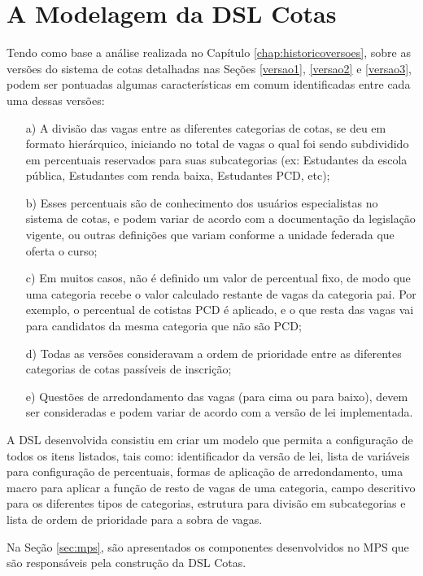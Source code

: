 \section{A Modelagem da DSL Cotas}
\label{sec:dslproposta:usuario}

   
 Tendo como base a análise realizada no Capítulo \ref{chap:historicoversoes}, sobre as versões do sistema de cotas detalhadas nas Seções \ref{versao1}, \ref{versao2} e \ref{versao3}, podem ser  pontuadas algumas características em comum identificadas entre cada uma dessas versões:
   
   \begin{enumerate}
    \item[a)] A divisão das vagas entre as diferentes categorias de cotas, se deu em formato hierárquico, iniciando no total de vagas o qual foi sendo subdividido em percentuais reservados para suas subcategorias (ex: Estudantes da escola pública, Estudantes com renda baixa, Estudantes PCD, etc); 
   
   \item[b)] Esses percentuais são de conhecimento dos usuários especialistas no sistema de cotas, e podem variar de acordo com a documentação da legislação vigente, ou outras definições que variam conforme a unidade federada que oferta o curso; 
   
   \item[c)] Em muitos casos, não é definido um valor de percentual fixo, de modo que uma categoria recebe o valor calculado restante de vagas da categoria pai. Por exemplo, o percentual de cotistas \gls{PCD} é aplicado, e o que resta das vagas vai para candidatos da mesma categoria que não são \gls{PCD};

   \item[d)] Todas as versões consideravam a ordem de prioridade entre as diferentes categorias de cotas passíveis de inscrição;
   
   \item[e)] Questões de arredondamento das vagas (para cima ou para baixo), devem ser consideradas e podem variar de acordo com a versão de lei implementada.

   \end{enumerate}
   
   A \gls{DSL} desenvolvida consistiu em criar um modelo que permita a configuração de todos os itens listados, tais como: identificador da versão de lei, lista de variáveis para configuração de percentuais, formas de aplicação de arredondamento, uma macro para aplicar a função de resto de vagas de uma categoria, campo descritivo para os diferentes tipos de categorias, estrutura para divisão em subcategorias e lista de ordem de prioridade para a sobra de vagas.
   
   
    Na Seção \ref{sec:mps}, são apresentados os componentes desenvolvidos no MPS que são responsáveis pela construção da DSL Cotas.
    
   
